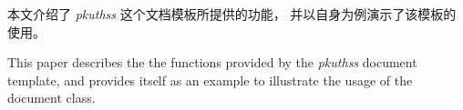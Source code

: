
\begin{cabstract}

	本文介绍了 \emph{pkuthss} 这个文档模板所提供的功能，
	并以自身为例演示了该模板的使用。

\end{cabstract}

\begin{eabstract}

	This paper describes the the functions provided by
	the \emph{pkuthss} document template,
	and provides itself as an example to illustrate
	the usage of the document class.

\end{eabstract}

